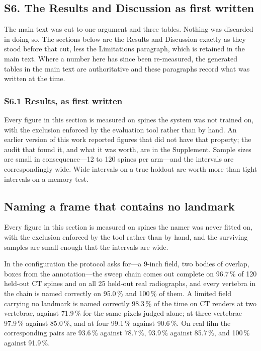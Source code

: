 \documentclass[11pt,letterpaper]{article}
\begin{document}
\clearpage

\subsection*{S6. The Results and Discussion as first written}
The main text was cut to one argument and three tables. Nothing was discarded in doing so. The sections below are the Results and Discussion exactly as they stood before that cut, less the Limitations paragraph, which is retained in the main text. Where a number here has since been re-measured, the generated tables in the main text are authoritative and these paragraphs record what was written at the time.

\subsubsection*{S6.1 Results, as first written}
Every figure in this section is measured on spines the system was not trained on, with the exclusion enforced by the evaluation tool rather than by hand. An earlier version of this work reported figures that did not have that property; the audit that found it, and what it was worth, are in the Supplement. Sample sizes are small in consequence---12 to 120 spines per arm---and the intervals are correspondingly wide. Wide intervals on a true holdout are worth more than tight intervals on a memory test.

\subsection*{Naming a frame that contains no landmark}
Every figure in this section is measured on spines the namer was never fitted on, with the exclusion enforced by the tool rather than by hand, and the surviving samples are small enough that the intervals are wide.

In the configuration the protocol asks for---a 9-inch field, two bodies of overlap, boxes from the annotation---the sweep chain comes out complete on 96.7\,\% of 120 held-out CT spines and on all 25 held-out real radiographs, and every vertebra in the chain is named correctly on 95.0\,\% and 100\,\% of them. A limited field carrying no landmark is named correctly 98.3\,\% of the time on CT renders at two vertebrae, against 71.9\,\% for the same pixels judged alone; at three vertebrae 97.9\,\% against 85.0\,\%, and at four 99.1\,\% against 90.6\,\%. On real film the corresponding pairs are 93.6\,\% against 78.7\,\%, 93.9\,\% against 85.7\,\%, and 100\,\% against 91.9\,\%.
\end{document}
